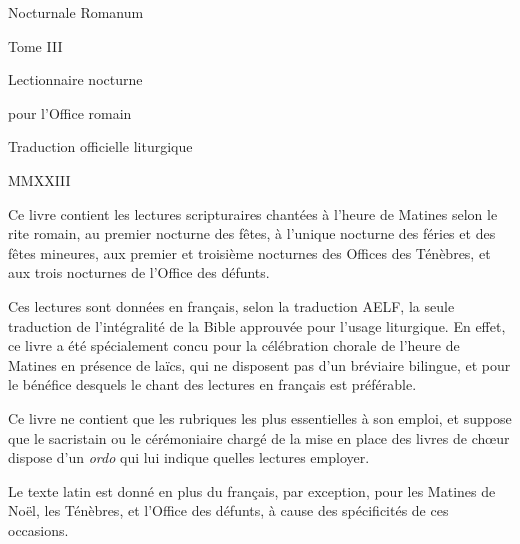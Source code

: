 \documentclass[twoside, french]{book}
\begin{document}

\null \newpage \null \newpage \null \newpage \null \newpage

\begin{titlepage}
\begin{center}
\null\vspace{2cm}
{\Large Nocturnale Romanum}

\vspace{5mm}

{\large Tome III}

\vspace{5cm}

{\Huge Lectionnaire nocturne}

\vspace{1cm}

{\Large pour l'Office romain}

\vfill

Traduction officielle liturgique

\vspace{5mm}

MMXXIII

\end{center}
\end{titlepage}

\setlength{\parindent}{6mm}

\vspace{2cm}

Ce livre contient les lectures scripturaires chantées à l'heure de Matines selon le rite romain,
au premier nocturne des fêtes, à l'unique nocturne des féries et des fêtes mineures,
aux premier et troisième nocturnes des Offices des Ténèbres, et aux trois nocturnes de l'Office des défunts.

Ces lectures sont données en français, selon la traduction AELF, la seule traduction de l'intégralité de la Bible approuvée pour l'usage liturgique.
En effet, ce livre a été spécialement concu pour la célébration chorale de l'heure de Matines en présence de laïcs,
qui ne disposent pas d'un bréviaire bilingue, et pour le bénéfice desquels le chant des lectures en français est préférable.

Ce livre ne contient que les rubriques les plus essentielles à son emploi,
et suppose que le sacristain ou le cérémoniaire chargé de la mise en place des livres de chœur dispose d'un \emph{ordo} qui lui indique quelles lectures employer.

Le texte latin est donné en plus du français, par exception, pour les Matines de Noël, les Ténèbres, et l'Office des défunts, à cause des spécificités de ces occasions.
\end{document}
